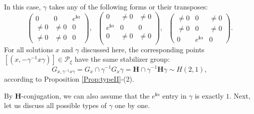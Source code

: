 \documentclass[12pt]{amsart}
\theoremstyle{definition}
\numberwithin{equation}{section}
\newcommand{\imagunit}{\mathbf{i}}
\newcommand{\Pxi}{\mathcal{P}_{\xi}}
\newcommand{\Cartan}{\mathbf{H}}
\begin{document}
  In this case, $\gamma$ takes any of the following forms or their transposes:
	$$
	\begin{pmatrix}
		0     		&     0				 &   e^{\imagunit  \alpha} \\
		   \neq 0    & \neq 0 & 0  \\
							 	\neq 0		    &  		\neq 0								 & 0
	\end{pmatrix},\mbox{ } \begin{pmatrix}
		0     		&   \neq 0				 & \neq 0  \\
		e^{\imagunit  \alpha}					 					    &  		0								 & 0\\
		0	    &  \neq 0    & \neq 0  \\
	\end{pmatrix}, \mbox{ } 
	\begin{pmatrix}
		\neq 0 &	0     		 			 & \neq 0  \\
		\neq 0 &	0     		 			 & \neq 0  \\
		0&	e^{\imagunit  \alpha}					 					    &  		0								  
	\end{pmatrix}.$$
For all solutions $x$ and $\gamma$ discussed here, the corresponding points $[(x,-\gamma^{-1}x\gamma)]\in \Pxi $ have the same stabilizer group:
$$G_{x, {\gamma^{-1}}x \gamma } = G_{x } \cap \gamma^{-1}G_{x }\gamma=\Cartan \cap \gamma^{-1}\Cartan\gamma\sim H(2,1),
$$
according to Proposition \ref{Prop:typeII}-(2). 



By $\Cartan$-conjugation, we can also assume that the $e^{\imagunit  \alpha}$ entry in $\gamma$ is exactly $1$. Next,   let us discuss  all possible types of $\gamma$ one by one.  
\end{document}

